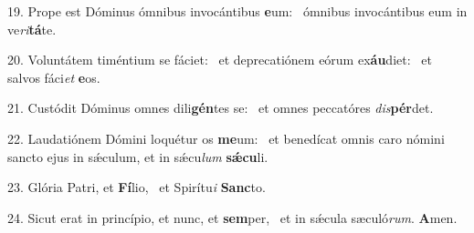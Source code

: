 19. Prope est Dóminus ómnibus invocántibus \textbf{e}um: \ast\  ómnibus invocántibus eum in ve\textit{ri}\textbf{tá}te.\

20. Voluntátem timéntium se fáciet: \dag\  et deprecatiónem eórum ex\textbf{áu}diet: \ast\  et salvos fáci\textit{et} \textbf{e}os.\

21. Custódit Dóminus omnes dili\textbf{gén}tes se: \ast\  et omnes peccatóres \textit{dis}\textbf{pér}det.\

22. Laudatiónem Dómini loquétur os \textbf{me}um: \ast\  et benedícat omnis caro nómini sancto ejus in sǽculum, et in sǽcu\textit{lum} \textbf{sǽ}\textbf{cu}li.\

23. Glória Patri, et \textbf{Fí}lio, \ast\  et Spirítu\textit{i} \textbf{Sanc}to.\

24. Sicut erat in princípio, et nunc, et \textbf{sem}per, \ast\  et in sǽcula sæculó\textit{rum}. \textbf{A}men.\

